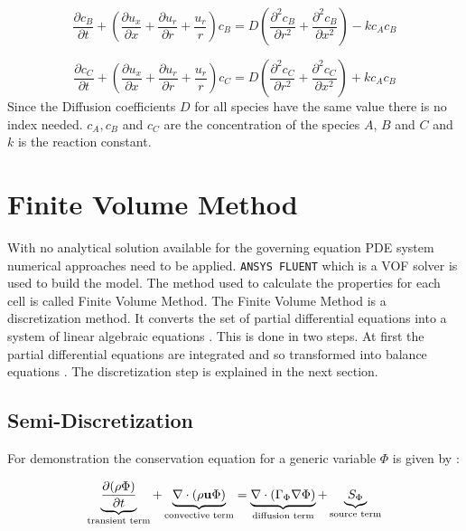 \documentclass[../thesis.tex]{subfiles}
\begin{document}
\begin{equation}
	\dfrac{\partial c_B}{\partial t} + \left( \dfrac{\partial u_x}{ \partial x} + \dfrac{\partial u_r}{ \partial r} + \dfrac{u_r}{r} \right) c_B =  D \left( \dfrac{\partial^2 c_B} {\partial r^2} + \dfrac{\partial^2 c_B}{\partial x^2} \right) - kc_A c_B
\end{equation}

\begin{equation}
	\dfrac{\partial c_C}{\partial t} + \left( \dfrac{\partial u_x}{ \partial x} + \dfrac{\partial u_r}{ \partial r} + \dfrac{u_r}{r} \right) c_C =  D \left( \dfrac{\partial^2 c_C} {\partial r^2} + \dfrac{\partial^2 c_C}{\partial x^2} \right) + kc_A c_B
\end{equation}
Since the Diffusion coefficients $D$ for all species have the same value there is no index needed. $c_A, c_B$ and $c_C$ are the concentration of the species $A$, $B$ and $C$ and $k$ is the reaction constant. 

\section{Finite Volume Method}
\label{sec: finite_volume}
With no analytical solution available for the governing equation PDE system numerical approaches need to be applied. \texttt{ANSYS FLUENT} which is a VOF solver is used to build the model. The method used to calculate the properties for each cell is called Finite Volume Method.
The Finite Volume Method is a discretization method. It converts the set of partial differential equations into a system of linear algebraic equations \cite{darwish2021finite}. This is done in two steps. At first the partial differential equations are integrated and so transformed into balance equations \cite{darwish2021finite}. The discretization step is explained in the next section.

\subsection{Semi-Discretization}

For demonstration the conservation equation for a generic variable $ \Phi $ is given by \cite{darwish2021finite}:

\begin{equation}
	\label{eqn:conserv_eq}
	\underbrace{\dfrac{\partial(\rho \Phi)}{\partial t}}_{\text{transient term}} + \underbrace{\nabla \cdot (\rho \bold{u} \Phi)}_{\text{convective term}} = \underbrace{\nabla \cdot (\Gamma_\Phi \nabla \Phi)}_{\text{diffusion term}} + \underbrace{S_\Phi}_{\text{source term}}
\end{equation}
\end{document}
